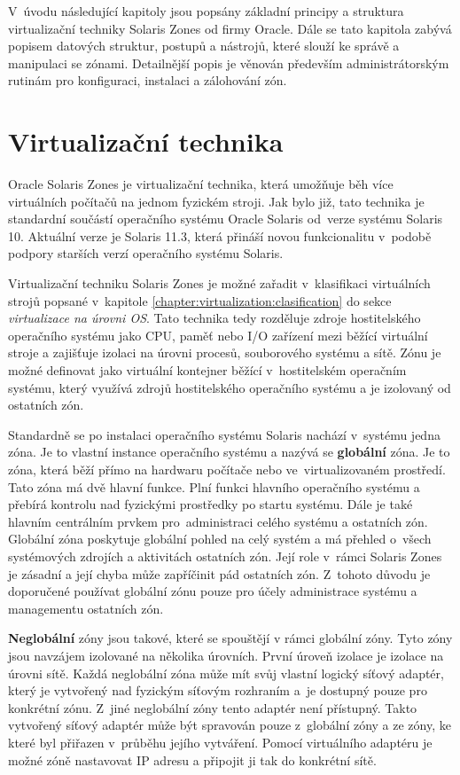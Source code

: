 \label{chapter:zones}
V~úvodu následující kapitoly jsou popsány základní principy a struktura virtualizační techniky Solaris Zones od
firmy Oracle. Dále se tato kapitola zabývá popisem datových struktur, postupů a nástrojů, které slouží ke správě a manipulaci
se zónami. Detailnější popis je věnován především administrátorským rutinám pro konfiguraci, instalaci a zálohování zón.
\section{Virtualizační technika}
\label{chapter:zones:technique}
Oracle Solaris Zones je virtualizační technika, která umožňuje běh více virtuálních počítačů na jednom fyzickém stroji. Jak
bylo již, tato technika je standardní součástí operačního systému Oracle Solaris od~verze systému Solaris 10.
Aktuální verze je Solaris 11.3, která přináší novou funkcionalitu v~podobě podpory starších verzí operačního systému Solaris.

Virtualizační techniku Solaris Zones je možné zařadit v~klasifikaci virtuálních strojů popsané v~kapitole \ref{chapter:virtualization:clasification}
do sekce \textit{virtualizace na úrovni OS}. Tato technika tedy rozděluje zdroje hostitelského
operačního systému jako CPU, paměť nebo I/O zařízení mezi běžící virtuální stroje a zajišťuje izolaci na úrovni procesů,
souborového systému a sítě. Zónu je možné definovat jako virtuální kontejner běžící v~hostitelském operačním systému, který
využívá zdrojů hostitelského operačního systému a je izolovaný od ostatních zón.

Standardně se po instalaci operačního systému Solaris nachází v~systému jedna zóna. Je to vlastní instance operačního systému
a nazývá se \textbf{globální} zóna. Je to zóna, která běží přímo na hardwaru počítače nebo ve~virtualizovaném
prostředí. Tato zóna má dvě hlavní funkce. Plní funkci hlavního operačního systému a přebírá kontrolu
nad fyzickými prostředky po startu systému. Dále je také hlavním centrálním prvkem pro~administraci celého systému a ostatních
zón. Globální zóna poskytuje globální pohled na celý systém a má přehled o~všech systémových zdrojích a aktivitách ostatních
zón. Její role v~rámci Solaris Zones je zásadní a její chyba může zapříčinit pád ostatních zón. Z~tohoto důvodu je doporučené
používat globální zónu pouze pro účely administrace systému a managementu ostatních zón.

\textbf{Neglobální} zóny jsou takové, které se spouštějí v rámci globální zóny. Tyto zóny jsou navzájem izolované na
několika úrovních. První úroveň izolace je izolace na úrovni sítě. Každá neglobální zóna může mít svůj vlastní logický síťový
adaptér, který je vytvořený nad fyzickým síťovým rozhraním a~je dostupný pouze pro konkrétní zónu. Z~jiné neglobální
zóny tento adaptér není přístupný. Takto vytvořený síťový adaptér může být spravován pouze z~globální zóny a ze zóny, ke které
byl přiřazen v~průběhu jejího vytváření. Pomocí virtuálního adaptéru je možné zóně nastavovat IP adresu a připojit ji tak
do konkrétní sítě.

